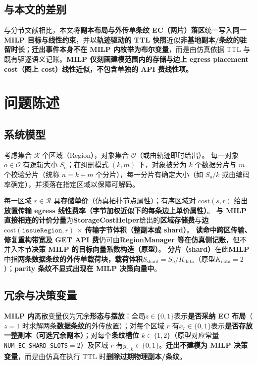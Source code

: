 \documentclass[conference]{IEEEtran}
\begin{document}
\subsection{与本文的差别}
与分节文献相比，本文将\textbf{副本布局与外传单条纹 EC（两片）落区}统一写入\textbf{同一 MILP 目标与线性约束}，并以\textbf{轨迹驱动的 TTL 快照}近似\textbf{非基地副本/条纹的驻留时长}；\textbf{迁出事件本身不在 MILP 内枚举为布尔变量}，而是由仿真依据 TTL 与既有驱逐语义记账。\textbf{MILP 仅刻画建模范围内的存储与边上 egress placement cost（图上 cost）线性近似，不包含单独的 API 费线性项。}

\section{问题陈述}
\label{sec:problem}

\subsection{系统模型}
考虑集合 $\mathcal{R}$ 个区域（Region），对象集合 $\mathcal{O}$（或由轨迹即时给出）。
每一对象 $o\in\mathcal{O}$ 有逻辑大小 $S_o$；在纠删模式 $(k,m)$ 下，对象被分为 $k$ 个数据分片与 $m$ 个校验分片（统称 $n{=}k{+}m$ 个分片），每一分片有确定大小（如 $S_o/k$ 或由编码率确定），并须落在指定区域以保障可解码。

每一区域 $r\in\mathcal{R}$ 具\textbf{存储单价}（仿真拓扑节点属性）；有序区域对 $\mathrm{cost}(s,r)$ 给出\textbf{放置传输 egress 线性费率（字节加权近似下的每条边上单价属性）}。
\textbf{与 MILP 直接相连的计价分量}为\textbf{StorageCostHelper}给出的\textbf{区域存储费}与\textbf{边 $\mathrm{cost}(\texttt{issueRegion}, r)$ $\times$ 传输字节体积（整副本或 shard）}。
\textbf{读命中跨区传输、修复重构带宽及 GET API 费}仍可由\textbf{RegionManager 等在仿真侧记账}，但不并入本节\textbf{决策 MILP 的目标向量系数构造（原型）}。
\textbf{分片（shard）}在此\textbf{MILP}中指\textbf{两条\textbf{数据}条纹的外传单载荷块，载荷体积\textbf{$S_{\mathrm{shard}}=S_o/K_{\mathrm{data}}$}}（原型\textbf{$K_{\mathrm{data}}=2$}）；\textbf{parity 条纹不显式出现在 MILP 决策向量中}。

\subsection{冗余与决策变量}
\textbf{MILP 内}离散变量仅为冗余\textbf{形态与摆放}：全局\textbf{$z\in\{0,1\}$}表示\textbf{是否采纳 EC 布局}（$z{=}1$ 时求解两条\textbf{数据条纹}的外传放置）；对每个区域 $r$ 有\textbf{$x_r\in\{0,1\}$}表示\textbf{是否存放一整副本（可选冗余副本）}；对每个\textbf{条纹槽位} $k\in\{1,2\}$（原型对应常量 \texttt{NUM\_EC\_SHARD\_SLOTS}$=$\textbf{$2$}）及区域 $r$ 有\textbf{$y_{r,k}\in\{0,1\}$}。\textbf{迁出不建模为 MILP 决策变量}，而是由仿真在执行 TTL 时\textbf{删除过期物理副本/条纹}。
\end{document}
